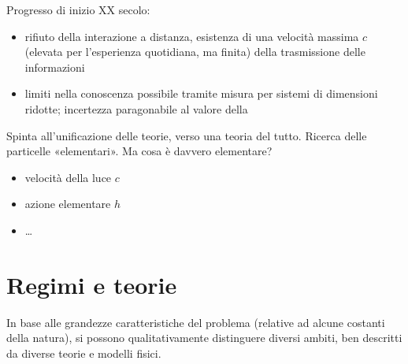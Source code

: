 \documentclass[letterpaper,10pt,italian]{jupyterBook}
\begin{document}
\sphinxAtStartPar
Progresso di inizio XX secolo:
\begin{itemize}
\item {} 
\sphinxAtStartPar
rifiuto della interazione a distanza, esistenza di una velocità massima  \(c\) (elevata per l’esperienza quotidiana, ma finita) della trasmissione delle informazioni

\item {} 
\sphinxAtStartPar
limiti nella conoscenza possibile tramite misura per sistemi di dimensioni ridotte; incertezza paragonabile al valore della {\hyperref[\detokenize{ch/intro/measurements:physics-hs-intro-measurements}]{}}

\end{itemize}

\sphinxAtStartPar
Spinta all’unificazione delle teorie, verso una teoria del tutto. Ricerca delle particelle «elementari». Ma cosa è davvero elementare?

\sphinxAtStartPar
{}
\begin{itemize}
\item {} 
\sphinxAtStartPar
velocità della luce \(c\)

\item {} 
\sphinxAtStartPar
azione elementare \(h\)

\item {} 
\sphinxAtStartPar
…

\end{itemize}


\section{Regimi e teorie}
\label{\detokenize{ch/intro/current-status:regimi-e-teorie}}\label{\detokenize{ch/intro/current-status:physics-hs-intro-current-status-regimes}}
\sphinxAtStartPar
In base alle grandezze caratteristiche del problema (relative ad alcune costanti della natura), si possono qualitativamente distinguere diversi ambiti, ben descritti da diverse teorie e modelli fisici.
\end{document}
